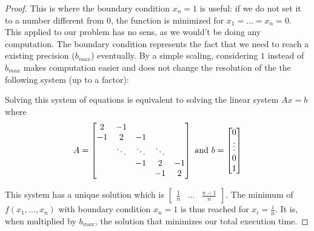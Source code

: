 \documentclass[sigplan]{acmart}
\begin{document}
\begin{proof}
   This is where the boundary condition $x_n = 1$ is useful: if we do not set it to a number different from 0, the function is minimized for $x_1=\dots=x_n=0$. This applied to our problem
   has no sens, as we would't be doing any computation. The boundary condition represents the fact that we need to reach a existing precision ($b_{max}$) eventually. By a simple scaling,
   considering $1$ instead of $b_{max}$ makes computation easier and does not change the resolution of the the following system (up to a factor):
   
  
  Solving this system of equations is equivalent to solving the linear system $Ax=b$ where
  \[ A = \begin{bmatrix}
    2       & -1 &  &  &  \\
    -1       & 2 & -1 &  &  \\
    & \ddots & \ddots & \ddots & \\
    & & -1 & 2 & -1 \\
           &  &  & -1 & 2
\end{bmatrix} \textup{ and } b = \begin{bmatrix} 0 \\ \vdots \\ 0 \\ 1 \end{bmatrix} \]
   
   This system has a unique solution which is $\begin{bmatrix} \frac{1}{n} & \dots & \frac{n-1}{n} \end{bmatrix}$.
   The minimum of $f(x_1,\dots,x_n)$ with boundary condition $x_n=1$ is thus reached for $x_i = \frac{i}{n}$.
   It is, when multiplied by $b_{max}$, the solution that minimizes our total execution time.
   \end{proof}
   
\end{document}
